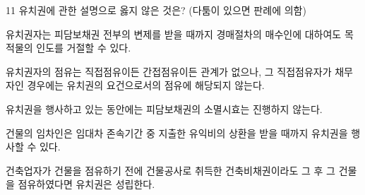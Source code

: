 \begin{question}{11}
유치권에 관한 설명으로 옳지 않은 것은? (다툼이 있으면 판례에 의함)
\begin{choices}
  \item 유치권자는 피담보채권 전부의 변제를 받을 때까지 경매절차의 매수인에 대하여도 목적물의 인도를 거절할 수 있다.
  \item 유치권자의 점유는 직접점유이든 간접점유이든 관계가 없으나, 그 직접점유자가 채무자인 경우에는 유치권의 요건으로서의 점유에 해당되지 않는다.
  \item 유치권을 행사하고 있는 동안에는 피담보채권의 소멸시효는 진행하지 않는다.
  \item 건물의 임차인은 임대차 존속기간 중 지출한 유익비의 상환을 받을 때까지 유치권을 행사할 수 있다.
  \item 건축업자가 건물을 점유하기 전에 건물공사로 취득한 건축비채권이라도 그 후 그 건물을 점유하였다면 유치권은 성립한다.
\end{choices}
\end{question}
